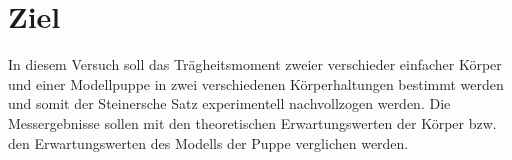 \section{Ziel}
In diesem Versuch soll das Trägheitsmoment zweier verschieder einfacher Körper
und einer Modellpuppe in zwei verschiedenen Körperhaltungen bestimmt werden und
somit der Steinersche Satz experimentell nachvollzogen werden.
Die Messergebnisse sollen mit den theoretischen Erwartungswerten der Körper bzw.
den Erwartungswerten des Modells der Puppe verglichen werden.
\label{sec:Ziel}
